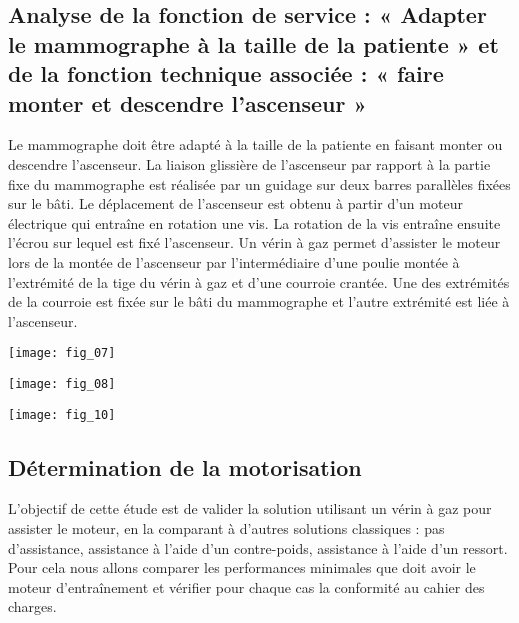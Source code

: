 \begin{multicols}{2}
\subsection*{Analyse de la fonction de service : « Adapter le
mammographe à la taille de la patiente » et de la fonction
technique associée : « faire monter et descendre
l’ascenseur »}
\ifprof
\else
Le mammographe doit être adapté à la taille de la patiente en faisant monter
ou descendre l’ascenseur. La liaison glissière de l’ascenseur par rapport à la partie
fixe du mammographe est réalisée par un guidage sur deux barres parallèles
fixées sur le bâti. Le déplacement de l’ascenseur est obtenu à partir d’un moteur
électrique qui entraîne en rotation une vis. La rotation de la vis entraîne ensuite
l’écrou sur lequel est fixé l’ascenseur.
Un vérin à gaz permet d’assister le moteur lors de la montée de l’ascenseur par
l’intermédiaire d’une poulie montée à l’extrémité de la tige du vérin à gaz et
d’une courroie crantée. Une des extrémités de la courroie est fixée sur le bâti du
mammographe et l’autre extrémité est liée à l’ascenseur.

\begin{center}
\texttt{[image: fig\_07]}
\end{center}

\begin{center}
\texttt{[image: fig\_08]}
\end{center}

\begin{center}
\texttt{[image: fig\_10]}
\end{center}

\fi

%

\subsection*{Détermination de la motorisation}
\begin{obj}
L’objectif de cette étude est de valider la solution utilisant un vérin à gaz
pour assister le moteur, en la comparant à d’autres solutions
classiques : pas d’assistance, assistance à l’aide d’un contre-poids,
assistance à l’aide d’un ressort. Pour cela nous allons comparer les performances
minimales que doit avoir le moteur d’entraînement et vérifier
pour chaque cas la conformité au cahier des charges.
\end{obj}


\end{multicols}

